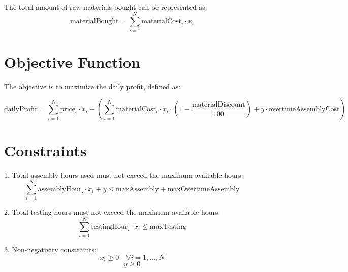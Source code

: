 \documentclass{article}
\begin{document}
The total amount of raw materials bought can be represented as:
\[
\text{materialBought} = \sum_{i=1}^{N} \text{materialCost}_i \cdot x_i
\]

\section*{Objective Function}

The objective is to maximize the daily profit, defined as:

\[
\text{dailyProfit} = \sum_{i=1}^{N} \text{price}_i \cdot x_i - \left( \sum_{i=1}^{N} \text{materialCost}_i \cdot x_i \cdot \left(1 - \frac{\text{materialDiscount}}{100}\right) + y \cdot \text{overtimeAssemblyCost} \right)
\]

\section*{Constraints}

1. Total assembly hours used must not exceed the maximum available hours:
\[
\sum_{i=1}^{N} \text{assemblyHour}_i \cdot x_i + y \leq \text{maxAssembly} + \text{maxOvertimeAssembly}
\]

2. Total testing hours must not exceed the maximum available hours:
\[
\sum_{i=1}^{N} \text{testingHour}_i \cdot x_i \leq \text{maxTesting}
\]

3. Non-negativity constraints:
\[
x_i \geq 0 \quad \forall i = 1, \ldots, N 
\]
\[
y \geq 0
\]
\end{document}
